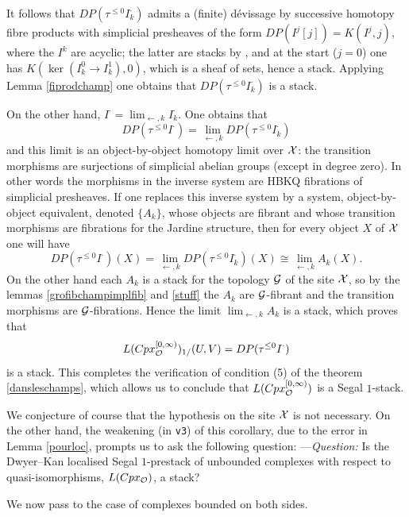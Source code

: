 It follows that
$DP(\tau ^{\leq 0} I^{\cdot}_{ k})$ admits a (finite) dévissage by
successive homotopy fibre products
with simplicial presheaves
of the form $DP(I^j[j]) = K(I^j, j)$, where the $I^k$ are acyclic;
the latter are stacks
by \cite{Jardine} \cite{KBrown}, and at the start ($j=0$)
one has $K(\ker (I^0_k\rightarrow I^1_k), 0)$, which is a sheaf
of sets, hence a stack. Applying Lemma \ref{fiprodchamp} one obtains
that $DP(\tau ^{\leq 0} I^{\cdot}_{k})$ is a stack.


On the other hand, $I^{\cdot} = \lim _{\leftarrow , k} I^{\cdot }_{k}$.
One obtains that
$$
DP(\tau ^{\leq 0} I^{\cdot}) = \lim _{\leftarrow , k}
DP(\tau ^{\leq 0} I^{\cdot}_k)
$$
and this limit is an object-by-object homotopy limit over
${\cal X}$:
the transition morphisms
are surjections of simplicial abelian groups
(except in degree zero). In other words
the morphisms in the inverse system are HBKQ fibrations
of simplicial presheaves. If one replaces
this inverse system by a system, object-by-object equivalent,
denoted $\{ A_k\}$, whose objects are fibrant and whose transition
morphisms are
fibrations for the Jardine structure, then for every object
$X$ of ${\cal X}$ one will have
$$
DP(\tau ^{\leq 0} I^{\cdot}) (X) = \lim _{\leftarrow , k}
DP(\tau ^{\leq 0} I^{\cdot}_k)(X)
\cong \lim _{\leftarrow , k} A_k(X).
$$
On the other hand each $A_k$ is a stack for the topology ${\cal G}$ of the site
${\cal X}$, so by the lemmas
\ref {grofibchampimplfib} and
\ref{stuff} the $A_k$ are ${\cal G}$-fibrant
and the transition morphisms are ${\cal G}$-fibrations.
Hence the limit $\lim _{\leftarrow , k} A_k$ is a stack,
which proves that
$$
L(Cpx_{{\cal O}}^{[0, \infty )})_{1/}(U,V)
= DP(\tau ^{\leq 0} I^{\cdot})
$$
is a stack.
This completes the verification of condition (5) of the theorem
\ref{dansleschamps}, which allows us to conclude that
$L(Cpx_{{\cal O}}^{[0,\infty )})$ is a Segal $1$-stack.
\eop

We conjecture of course that the hypothesis on the site ${\cal X}$
is not
necessary. On the other hand, the weakening (in {\tt v3}) of this corollary,
due to the error
in Lemma \ref{pourloc}, prompts us to ask the following question:
\newline
---{\em Question:} Is the Dwyer--Kan localised Segal $1$-prestack
of unbounded complexes with respect to quasi-isomorphisms,
$L(Cpx_{{\cal O}})$, a stack?


We now pass to the case of complexes bounded
on both sides.


